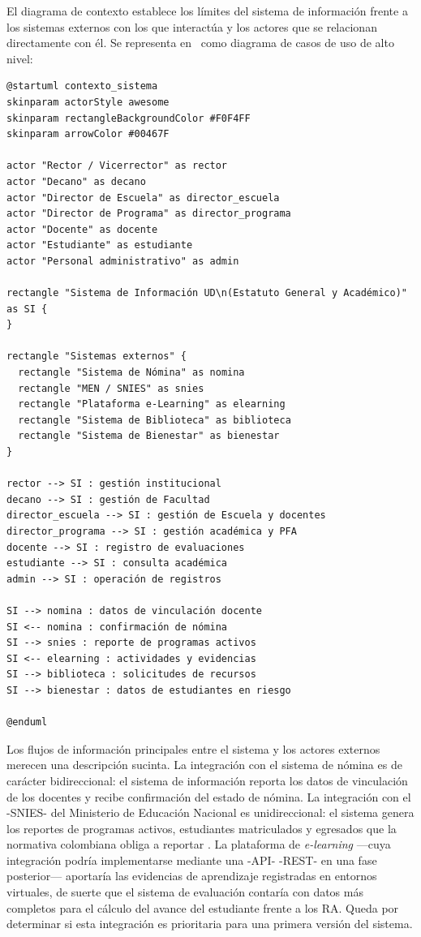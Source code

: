 El diagrama de contexto establece los límites del sistema de información
frente a los sistemas externos con los que interactúa y los actores
que se relacionan directamente con él. Se representa en \plantuml\ como
diagrama de casos de uso de alto nivel:

\begin{lstlisting}[style=plantumlStyle,
  caption={Diagrama de contexto del sistema de información de la \ud\
    (PlantUML — nivel de contexto).},
  label={lst:plantuml-contexto}]
@startuml contexto_sistema
skinparam actorStyle awesome
skinparam rectangleBackgroundColor #F0F4FF
skinparam arrowColor #00467F

actor "Rector / Vicerrector" as rector
actor "Decano" as decano
actor "Director de Escuela" as director_escuela
actor "Director de Programa" as director_programa
actor "Docente" as docente
actor "Estudiante" as estudiante
actor "Personal administrativo" as admin

rectangle "Sistema de Información UD\n(Estatuto General y Académico)" as SI {
}

rectangle "Sistemas externos" {
  rectangle "Sistema de Nómina" as nomina
  rectangle "MEN / SNIES" as snies
  rectangle "Plataforma e-Learning" as elearning
  rectangle "Sistema de Biblioteca" as biblioteca
  rectangle "Sistema de Bienestar" as bienestar
}

rector --> SI : gestión institucional
decano --> SI : gestión de Facultad
director_escuela --> SI : gestión de Escuela y docentes
director_programa --> SI : gestión académica y PFA
docente --> SI : registro de evaluaciones
estudiante --> SI : consulta académica
admin --> SI : operación de registros

SI --> nomina : datos de vinculación docente
SI <-- nomina : confirmación de nómina
SI --> snies : reporte de programas activos
SI <-- elearning : actividades y evidencias
SI --> biblioteca : solicitudes de recursos
SI --> bienestar : datos de estudiantes en riesgo

@enduml
\end{lstlisting}

Los flujos de información principales entre el sistema y los actores
externos merecen una descripción sucinta. La integración con el sistema
de nómina es de carácter bidireccional: el sistema de información
reporta los datos de vinculación de los docentes y recibe confirmación
del estado de nómina. La integración con el -SNIES- del Ministerio de
Educación Nacional es unidireccional: el sistema genera los reportes
de programas activos, estudiantes matriculados y egresados que la
normativa colombiana obliga a reportar \autocite{Decreto1330_2019}.
La plataforma de \textit{e-learning} ---cuya integración podría
implementarse mediante una -API- -REST- en una fase posterior--- aportaría
las evidencias de aprendizaje registradas en entornos virtuales, de suerte
que el sistema de evaluación contaría con datos más completos para el
cálculo del avance del estudiante frente a los RA. Queda por determinar
si esta integración es prioritaria para una primera versión del sistema.

